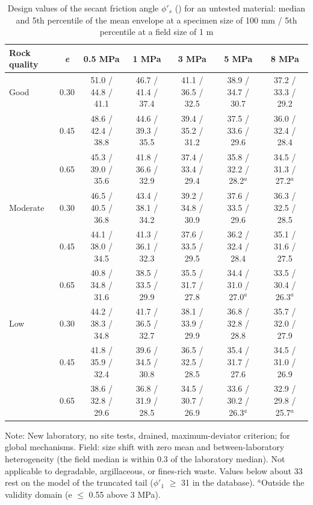 \documentclass[Journal,letterpaper]{ascelike-new}
\begin{document}
\begin{table}
\caption{Design values of the secant friction angle $\phi'_s$ (\textdegree{}) for an untested material: median and 5th percentile of the mean envelope at a specimen size of 100 mm / 5th percentile at a field size of 1 m}
\label{tab:3}
\centering\footnotesize
\renewcommand{\arraystretch}{1.15}
\setlength{\tabcolsep}{3pt}
\begin{tabular}{lcccccc}
\hline
Rock quality & \textit{e} & 0.5 MPa & 1 MPa & 3 MPa & 5 MPa & 8 MPa \\
\hline
Good & 0.30 & 51.0 / 44.8 / 41.1 & 46.7 / 41.4 / 37.4 & 41.1 / 36.5 / 32.5 & 38.9 / 34.7 / 30.7 & 37.2 / 33.3 / 29.2 \\
 & 0.45 & 48.6 / 42.4 / 38.8 & 44.6 / 39.3 / 35.5 & 39.4 / 35.2 / 31.2 & 37.5 / 33.6 / 29.6 & 36.0 / 32.4 / 28.4 \\
 & 0.65 & 45.3 / 39.0 / 35.6 & 41.8 / 36.6 / 32.9 & 37.4 / 33.4 / 29.4 & 35.8 / 32.2 / 28.2$^{a}$ & 34.5 / 31.3 / 27.2$^{a}$ \\
Moderate & 0.30 & 46.5 / 40.5 / 36.8 & 43.4 / 38.1 / 34.2 & 39.2 / 34.8 / 30.9 & 37.6 / 33.5 / 29.6 & 36.3 / 32.5 / 28.5 \\
 & 0.45 & 44.1 / 38.0 / 34.5 & 41.3 / 36.1 / 32.3 & 37.6 / 33.5 / 29.5 & 36.2 / 32.4 / 28.4 & 35.1 / 31.6 / 27.5 \\
 & 0.65 & 40.8 / 34.8 / 31.6 & 38.5 / 33.5 / 29.9 & 35.5 / 31.7 / 27.8 & 34.4 / 31.0 / 27.0$^{a}$ & 33.5 / 30.4 / 26.3$^{a}$ \\
Low & 0.30 & 44.2 / 38.3 / 34.8 & 41.7 / 36.5 / 32.7 & 38.1 / 33.9 / 29.9 & 36.8 / 32.8 / 28.8 & 35.7 / 32.0 / 27.9 \\
 & 0.45 & 41.8 / 35.9 / 32.4 & 39.6 / 34.5 / 30.8 & 36.5 / 32.5 / 28.5 & 35.4 / 31.7 / 27.6 & 34.5 / 31.0 / 26.9 \\
 & 0.65 & 38.6 / 32.8 / 29.6 & 36.8 / 31.9 / 28.5 & 34.5 / 30.7 / 26.9 & 33.6 / 30.2 / 26.3$^{a}$ & 32.9 / 29.8 / 25.7$^{a}$ \\
\hline
\end{tabular}
\par\vspace{4pt}\parbox{\linewidth}{\footnotesize Note: New laboratory, no site tests, drained, maximum-deviator criterion; for global mechanisms. Field: size shift with zero mean and between-laboratory heterogeneity (the field median is within 0.3\textdegree{} of the laboratory median). Not applicable to degradable, argillaceous, or fines-rich waste. Values below about 33\textdegree{} rest on the model of the truncated tail ($\phi'_1$ $\ge$ 31\textdegree{} in the database). $^{a}$Outside the validity domain (e $\le$ 0.55 above 3 MPa).}
\end{table}
\end{document}
